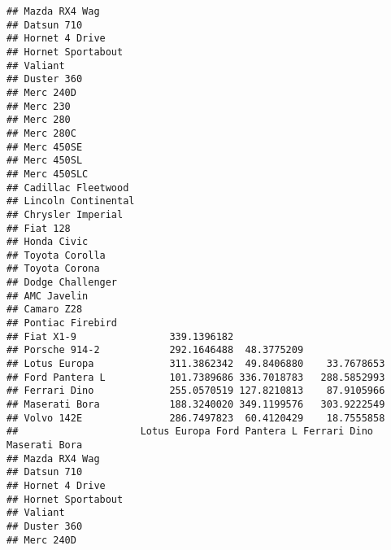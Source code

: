 \documentclass[]{book}
\begin{document}
\begin{verbatim}
## Mazda RX4 Wag                                                 
## Datsun 710                                                    
## Hornet 4 Drive                                                
## Hornet Sportabout                                             
## Valiant                                                       
## Duster 360                                                    
## Merc 240D                                                     
## Merc 230                                                      
## Merc 280                                                      
## Merc 280C                                                     
## Merc 450SE                                                    
## Merc 450SL                                                    
## Merc 450SLC                                                   
## Cadillac Fleetwood                                            
## Lincoln Continental                                           
## Chrysler Imperial                                             
## Fiat 128                                                      
## Honda Civic                                                   
## Toyota Corolla                                                
## Toyota Corona                                                 
## Dodge Challenger                                              
## AMC Javelin                                                   
## Camaro Z28                                                    
## Pontiac Firebird                                              
## Fiat X1-9                339.1396182                          
## Porsche 914-2            292.1646488  48.3775209              
## Lotus Europa             311.3862342  49.8406880    33.7678653
## Ford Pantera L           101.7389686 336.7018783   288.5852993
## Ferrari Dino             255.0570519 127.8210813    87.9105966
## Maserati Bora            188.3240020 349.1199576   303.9222549
## Volvo 142E               286.7497823  60.4120429    18.7555858
##                     Lotus Europa Ford Pantera L Ferrari Dino Maserati Bora
## Mazda RX4 Wag                                                             
## Datsun 710                                                                
## Hornet 4 Drive                                                            
## Hornet Sportabout                                                         
## Valiant                                                                   
## Duster 360                                                                
## Merc 240D                                                                 

\end{verbatim}
\end{document}
